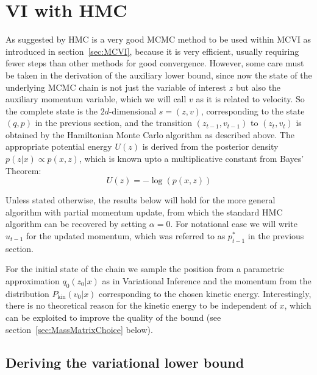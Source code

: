 \section{VI with HMC}
\label{sec:HMCVI}
As suggested by \textcite{Salimans2014} HMC is a very good MCMC method to be used within MCVI as introduced in section~\ref{sec:MCVI}, because it is very efficient, usually requiring fewer steps than other methods for good convergence. However, some care must be taken in the derivation of the auxiliary lower bound, since now the state of the underlying MCMC chain is not just the variable of interest $z$ but also the auxiliary momentum variable, which we will call $v$ as it is related to velocity. So the complete state is the $2d$-dimensional $s=(z, v)$, corresponding to the state $(q, p)$ in the previous section, and the transition $(z_{t-1}, v_{t-1})$ to $(z_t, v_t)$ is obtained by the Hamiltonian Monte Carlo algorithm as described above. The appropriate potential energy $U(z)$ is derived from the posterior density $p(z|x) \propto p(x, z)$, which is known upto a multiplicative constant from Bayes' Theorem:
\begin{equation} \label{eq:VIwithHMCPotEnergy}
U(z) = -\log(p(x, z))
\end{equation}

Unless stated otherwise, the results below will hold for the more general algorithm with partial momentum update, from which the standard HMC algorithm can be recovered by setting $\alpha = 0$. For notational ease we will write $u_{t-1}$ for the updated momentum, which was referred to as $p^*_{t-1}$ in the previous section.

\label{sec:KinEnergyMayDependOnX}
For the initial state of the chain we sample the position from a parametric approximation $q_0(z_0|x)$ as in Variational Inference and the momentum from the distribution $P_\textrm{kin}(v_0|x)$ corresponding to the chosen kinetic energy. Interestingly, there is no theoretical reason for the kinetic energy to be independent of $x$, which can be exploited to improve the quality of the bound (see section~\ref{sec:MassMatrixChoice} below).

\subsection{Deriving the variational lower bound}

